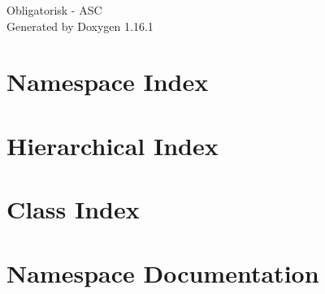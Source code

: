 \documentclass[twoside]{book}
\newcommand{\+}{\discretionary{\mbox{\scriptsize$\hookleftarrow$}}{}{}}
\newcommand{\clearemptydoublepage}{%
    \newpage{\pagestyle{empty}\cleardoublepage}%
  }
\begin{document}
  \raggedbottom
    \hypersetup{pageanchor=false,
                bookmarksnumbered=true,
                pdfencoding=unicode
               }
  \begin{titlepage}
  \vspace*{7cm}
  \begin{center}%
  {\Large Obligatorisk -\/ ASC}\\
  \vspace*{1cm}
  {\large Generated by Doxygen 1.16.1}\\
  \end{center}
  \end{titlepage}
  \clearemptydoublepage
  \tableofcontents
  \clearemptydoublepage
  \hypersetup{pageanchor=true}
\chapter{Namespace Index}

\chapter{Hierarchical Index}

\chapter{Class Index}

\chapter{Namespace Documentation}














\end{document}
